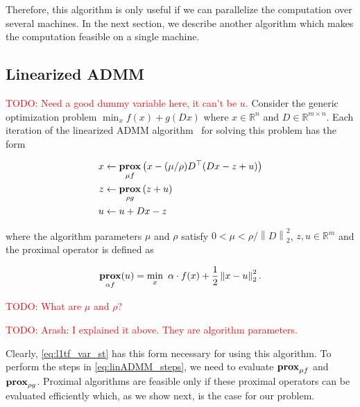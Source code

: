 \documentclass{article}
\newcommand{\attn}[1]{\textcolor{red}{TODO: #1}}
\newcommand{\norm}[1]{\left\lVert #1 \right\rVert}
\DeclareMathOperator*{\prox}{\bf prox}
\begin{document}
Therefore, this algorithm is only useful if we can parallelize the
computation over several machines. In the next section, we describe
another algorithm which makes the computation feasible on a single
machine. 

\subsection{Linearized ADMM}
\label{sec:linADMM}


\attn{Need a good dummy variable here, it can't be $u$.} Consider the generic optimization problem
$\min_x f(x)+g(Dx)$
where $x\in \mathbb{R}^n$ and $D\in \mathbb{R}^{m\times n}$. Each
iteration of the linearized ADMM
algorithm~\citep{parikh_proximal_2014} for solving this problem 
has the form

\begin{align}
x & \leftarrow \prox_{\mu f} \left(x - (\mu/\rho)D^\top (D x - z + u )\right)\\
z & \leftarrow \prox_{\rho g} \left(z + u\right) \label{eq:linADMM_steps}\\
u & \leftarrow u + D x - z
\end{align}

\noindent where the algorithm parameters $\mu$ and $\rho$ satisfy $0 < \mu < \rho/\norm{D}_2^2$, $z,u\in \mathbb{R}^m$ and the proximal operator is defined as

\begin{equation}
 \prox_{\alpha f}(u) = \min_x \,\, \alpha \cdot f(x)+\frac{1}{2} \norm{ x-u}_2^2.
\label{eq:linADMM_prox}
\end{equation}

\attn{What are $\mu$ and $\rho$?}

\attn{Arash: I explained it above. They are algorithm parameters.}


Clearly, \eqref{eq:l1tf_var_st} has this form necessary for using this algorithm.
To perform the steps in \eqref{eq:linADMM_steps}, we need to evaluate
$\prox_{\mu f}$ and $\prox_{\rho g}$. Proximal
algorithms are feasible only if these proximal operators can be
evaluated efficiently which, as we show next, is the case for our
problem.  
\end{document}
